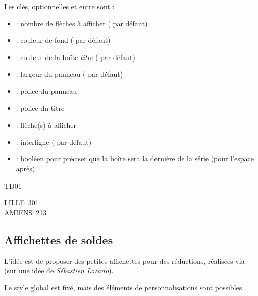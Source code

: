 \documentclass[french,11pt,a4paper]{article}
\begin{document}
Les clés, optionnelles et entre \MontreCode{[...]} sont :

\begin{itemize}
	\item {} : nombre de flèches à afficher ( par défaut)
	\item {} : couleur de fond ( par défaut)
	\item {} : couleur de la boîte \textit{titre} ( par défaut)
	\item {} : largeur du panneau (\MontreCode{10cm} par défaut)
	\item {} : police du panneau
	\item {} : police du titre
	\item {} : flèche(s) à afficher
	\item {} : interligne (\MontreCode{2.5mm} par défaut)
	\item {} : booléen pour préciser que la boîte sera la dernière de la série (pour l'espace après).
\end{itemize}

\begin{DemoCode}{}
\begin{PanneauAutoroute}[Largeur=\linewidth,Dernier=false]{TD01}
\end{PanneauAutoroute}

\begin{PanneauAutoroute}%
	[CouleurFond=olive,Fleches=2,Police=\bfseries\huge\fontfamily{phv}\selectfont]{}
	LILLE\hfill~301\\
	AMIENS\hfill~213
\end{PanneauAutoroute}
\end{DemoCode}

\pagebreak

\subsection{Affichettes de soldes}

L'idée est de proposer des petites affichettes pour des réductions, réalisées via  (sur une idée de \textit{Sébastien Lozano}).

Le style global est fixé, mais des éléments de personnalisations sont possibles..
\end{document}
